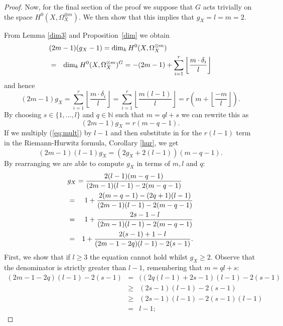 \begin{proof}
    Now, for the final section of the proof we suppose that $G$ acts trivially on the space $H^0(X,\Omega_X^{\otimes m})$.
    We then show that this implies that $g_X=l=m=2$.
    
    
    From Lemma \ref{dim3} and Proposition~\ref{dim} we obtain
      \begin{eqnarray*}
	\lefteqn{(2m-1)(g_X-1)=\dim_kH^0(X,\Omega_X^{\otimes m})} \\
	& = & \dim_kH^0(X,\Omega_X^{\otimes m})^G=-(2m-1)+\sum_{i=1}^r \left\lfloor \frac{m\cdot \delta_i}{l} \right\rfloor
      \end{eqnarray*}
    and hence
      \begin{equation*}
	(2m-1)g_X = \sum_{i=1}^r \left\lfloor \frac{m\cdot \delta_i}{l} \right\rfloor
	= \sum_{i=1}^r \left\lfloor \frac{m(l-1)}{l} \right\rfloor
	= r\left( m+\left\lfloor \frac{-m}{l} \right\rfloor \right).
      \end{equation*}
    By choosing $s\in \{1,\ldots ,l\}$ and $q\in \mathbb{N}$ such that $m=ql+s$ we can rewrite this as
      \begin{equation}\label{eq:mult}
	(2m-1)g_X=r(m-q-1).
      \end{equation}
    If we multiply (\ref{eq:mult}) by $l-1$ and then substitute in for the $r(l-1)$ term in the Riemann-Hurwitz formula, Corollary \ref{hur}, we get
      \begin{equation*}
	(2m-1)(l-1)g_X=(2g_X+2(l-1))(m-q-1).
      \end{equation*}
    By rearranging we are able to compute $g_X$ in terms of $m,l$ and $q$:
      \begin{eqnarray*}
	\lefteqn{g_X = \frac{2(l-1)(m-q-1)}{(2m-1)(l-1)-2(m-q-1)}} \\
	& = & 1 + \frac{2(m-q-1)-(2q+1)(l-1)}{(2m-1)(l-1)-2(m-q-1)} \\
	& = & 1 + \frac{2s-1-l}{(2m-1)(l-1)-2(m-q-1)}  \\
	& = & 1 + \frac{2(s-1)+1-l}{(2m-1-2q)(l-1)-2(s-1)}. 
      \end{eqnarray*}
    First, we show that if $l\geq 3$ the equation cannot hold whilst $g_X\geq 2$.
    Observe that the denominator is strictly greater than $l-1$, remembering that $m=ql+s$:
      \begin{eqnarray*}
	(2m-1-2q)(l-1)-2(s-1) & = & ((2q(l-1)+2s-1)(l-1)-2(s-1) \\
	& \geq & (2s-1)(l-1)-2(s-1) \\
	& \geq & (2s-1)(l-1)-2(s-1)(l-1) \\
	& = & l-1;

\end{eqnarray*}
\end{proof}
